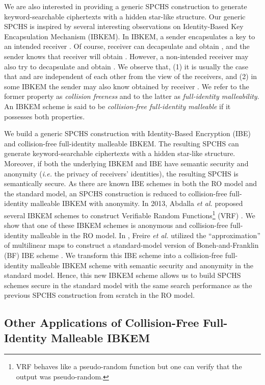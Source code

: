 \documentclass[10pt,twocolumn,twoside]{IEEEtran}
\begin{document}
We are also interested in providing a generic SPCHS construction to generate keyword-searchable ciphertexts with a hidden star-like structure. Our generic SPCHS is inspired by several interesting observations on Identity-Based Key Encapsulation Mechanism (IBKEM). In IBKEM, a sender encapsulates a key  to an intended receiver . Of course, receiver  can decapsulate and obtain , and the sender knows that receiver  will obtain . However, a non-intended receiver  may also try to decapsulate and obtain . We observe that, (1) it is usually the case that  and  are independent of each other from the view of the receivers, and (2) in some IBKEM the sender may also know  obtained by receiver . We refer to the former property as \emph{collision freeness} and to the latter as \emph{full-identity malleability}. An IBKEM scheme is said to be \emph{collision-free full-identity malleable} if it possesses both properties. 

We build a generic SPCHS construction with Identity-Based Encryption (IBE) and collision-free full-identity malleable IBKEM. The resulting SPCHS can generate keyword-searchable ciphertexts with a hidden star-like structure. Moreover, if both the underlying IBKEM and IBE have semantic security and anonymity (\emph{i.e.} the privacy of receivers' identities), the resulting SPCHS is semantically secure. As there are known IBE schemes \cite{BW06,G06,AG09,D10} in both the RO model and the standard model, an SPCHS construction is reduced to collision-free full-identity malleable IBKEM with anonymity. In 2013, Abdalla \emph{et al.} proposed several IBKEM schemes to construct Verifiable Random Functions\footnote{VRF behaves like a pseudo-random function but one can verify that the output was
pseudo-random.} (VRF) \cite{ACF13}. We show that one of these IBKEM schemes is anonymous and collision-free full-identity malleable in the RO model. In \cite{FHPS13}, Freire \emph{et al.}  utilized the ``approximation'' of multilinear maps \cite{GGH13} to construct a standard-model version of Boneh-and-Franklin (BF) IBE scheme \cite{BF01}. We transform this IBE scheme into a collision-free full-identity malleable IBKEM scheme with semantic security and anonymity in the standard model. Hence, this new IBKEM scheme allows us to build SPCHS schemes secure in the standard model with the same search performance as the previous SPCHS construction 
from scratch 
in the RO model.

\subsection{Other Applications of Collision-Free Full-Identity Malleable IBKEM}
\end{document}
